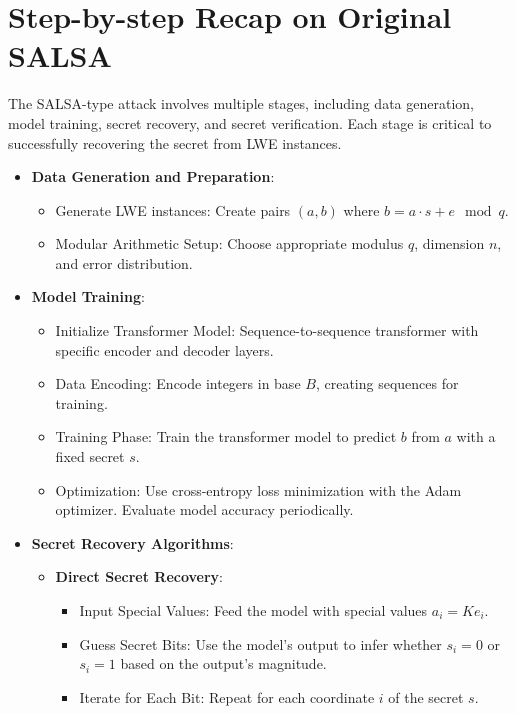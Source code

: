 \documentclass{article}
\begin{document}
\section{Step-by-step Recap on Original SALSA}

The SALSA-type attack involves multiple stages, including data generation, model training, secret recovery, and secret verification. Each stage is critical to successfully recovering the secret from LWE instances.

\begin{itemize}
    \item \textbf{Data Generation and Preparation}:
    \begin{itemize}
        \item Generate LWE instances: Create pairs $(a, b)$ where $b = a \cdot s + e \mod q$.
        \item Modular Arithmetic Setup: Choose appropriate modulus $q$, dimension $n$, and error distribution.
    \end{itemize}
    \item \textbf{Model Training}:
    \begin{itemize}
        \item Initialize Transformer Model: Sequence-to-sequence transformer with specific encoder and decoder layers.
        \item Data Encoding: Encode integers in base $B$, creating sequences for training.
        \item Training Phase: Train the transformer model to predict $b$ from $a$ with a fixed secret $s$.
        \item Optimization: Use cross-entropy loss minimization with the Adam optimizer. Evaluate model accuracy periodically.
    \end{itemize}
    \item \textbf{Secret Recovery Algorithms}:
    \begin{itemize}
        \item \textbf{Direct Secret Recovery}:
        \begin{itemize}
            \item Input Special Values: Feed the model with special values $a_i = K e_i$.
            \item Guess Secret Bits: Use the model's output to infer whether $s_i = 0$ or $s_i = 1$ based on the output's magnitude.
            \item Iterate for Each Bit: Repeat for each coordinate $i$ of the secret $s$.
        \end{itemize}

\end{itemize}
\end{itemize}
\end{document}
